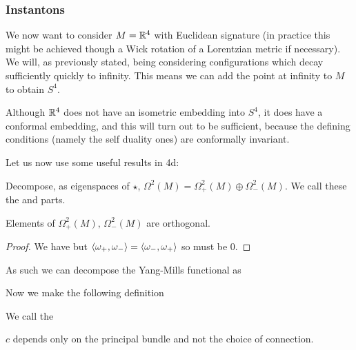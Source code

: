 \documentclass{article}
\begin{document}
\subsubsection{Instantons}

We now want to consider $M=\mathbb{R}^4$ with Euclidean signature (in practice this might be achieved though a Wick rotation of a Lorentzian metric if necessary). We will, as previously stated, being considering configurations which decay sufficiently quickly to infinity. This means we can add the point at infinity to $M$ to obtain $S^4$.

\begin{remark}
	Although $\mathbb{R}^4$ does not have an isometric embedding into $S^4$, it does have a conformal embedding, and this will turn out to be sufficient, because the defining conditions (namely the self duality ones) are conformally invariant.  
\end{remark}

Let us now use some useful results in 4d: 



\begin{definition}
	Decompose, as eigenspaces of $\star$, $\Omega^2(M) = \Omega^2_+(M) \oplus \Omega^2_-(M)$. We call these the  and  parts.
\end{definition}

\begin{lemma}
	Elements of $\Omega^2_+(M), \, \Omega^2_-(M)$ are orthogonal. 
\end{lemma}
\begin{proof}
	We have 
but $\left\langle \omega_+, \omega_- \right\rangle = \left\langle \omega_-, \omega_+ \right\rangle$ so must be 0. 
\end{proof}

As such we can decompose the Yang-Mills functional as 

Now we make the following definition
\begin{definition}
	We call 
the 
\end{definition}	
	
\begin{prop}
	$c$ depends only on the principal bundle and not the choice of connection. 
\end{prop}
	
\end{document}
